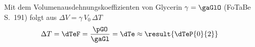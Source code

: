 Mit dem Volumenausdehnungskoeffizienten von Glycerin $\gamma = \gaGlO$ (FoTaBe S.~191) folgt aus $\Delta V = \gamma\,V_0\,\Delta T$
\begin{align}
 \Delta T &= \dTeF = \frac{\pGO}{\gaGl} = \dTe \approx \result{\dTeP{0}{2}}
\end{align}
